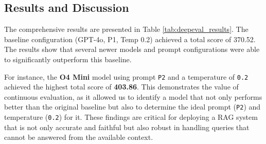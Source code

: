 \subsection{Results and Discussion}
The comprehensive results are presented in Table \ref{tab:deepeval_results}. The baseline configuration (GPT-4o, P1, Temp 0.2) achieved a total score of 370.52. The results show that several newer models and prompt configurations were able to significantly outperform this baseline.

For instance, the \textbf{O4 Mini} model using prompt \texttt{P2} and a temperature of \texttt{0.2} achieved the highest total score of \textbf{403.86}. This demonstrates the value of continuous evaluation, as it allowed us to identify a model that not only performs better than the original baseline but also to determine the ideal prompt (\texttt{P2}) and temperature (\texttt{0.2}) for it. These findings are critical for deploying a RAG system that is not only accurate and faithful but also robust in handling queries that cannot be answered from the available context.

